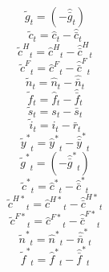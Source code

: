 \begin{dmath}
{{\tilde g}}_{t}=\left(-{{\hat {\bar g}}}_{t}\right)
\end{dmath}
\begin{dmath}
{{\tilde c}}_{t}={{\hat c}}_{t}-{{\hat {\bar c}}}_{t}
\end{dmath}
\begin{dmath}
{{\tilde c^H}}_{t}={{\hat c^H}}_{t}-{{\hat {\bar c}^H}}_{t}
\end{dmath}
\begin{dmath}
{{\tilde c^F}}_{t}={{\hat c^F}}_{t}-{{\hat {\bar c}^F}}_{t}
\end{dmath}
\begin{dmath}
{{\tilde n}}_{t}={{\hat n}}_{t}-{{\hat {\bar n}}}_{t}
\end{dmath}
\begin{dmath}
{{\tilde f}}_{t}={{\hat f}}_{t}-{{\hat {\bar f}}}_{t}
\end{dmath}
\begin{dmath}
{{\tilde s}}_{t}={{s}}_{t}-{{\bar s}}_{t}
\end{dmath}
\begin{dmath}
{{\tilde i}}_{t}={{i}}_{t}-{{\bar r}}_{t}
\end{dmath}
\begin{dmath}
{{\tilde y^*}}_{t}={{\hat y^*}}_{t}-{{\hat {\bar y}^*}}_{t}
\end{dmath}
\begin{dmath}
{{\tilde g^*}}_{t}=\left(-{{\hat {\bar g}^*}}_{t}\right)
\end{dmath}
\begin{dmath}
{{\tilde c^*}}_{t}={{\hat c^*}}_{t}-{{\hat {\bar c}^*}}_{t}
\end{dmath}
\begin{dmath}
{{\tilde c^{H*}}}_{t}={{\hat c^{H*}}}_{t}-{{\hat {\bar c}^{H*}}}_{t}
\end{dmath}
\begin{dmath}
{{\tilde c^{F*}}}_{t}={{\hat c^{F*}}}_{t}-{{\hat {\bar c}^{F*}}}_{t}
\end{dmath}
\begin{dmath}
{{\tilde n^*}}_{t}={{\hat n^*}}_{t}-{{\hat {\bar n}^*}}_{t}
\end{dmath}
\begin{dmath}
{{\tilde f^*}}_{t}={{\hat f^*}}_{t}-{{\hat {\bar f}^*}}_{t}
\end{dmath}
